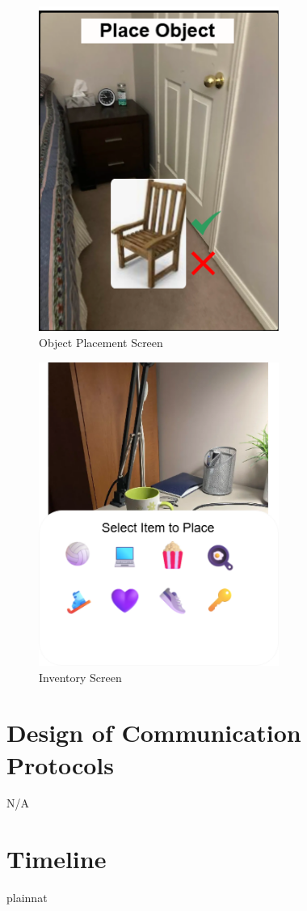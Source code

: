 \documentclass[12pt, titlepage]{article}
\begin{document}
\begin{figure}[H]
\centering
\includegraphics[width=0.7\textwidth]{OPScreen.png}
\caption{Object Placement Screen}
\label{FigOP}
\end{figure}

\begin{figure}[H]
\centering
\includegraphics[width=0.7\textwidth]{IScreen.png}
\caption{Inventory Screen}
\label{FigI}
\end{figure}

\section{Design of Communication Protocols}

N/A

\section{Timeline}



 {plainnat}


\newpage{}
\end{document}
